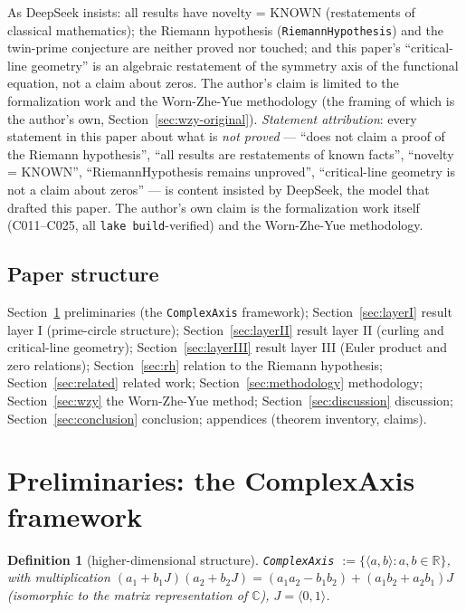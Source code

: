 \documentclass[11pt]{article}
\newtheorem{definition}{Definition}
\theoremstyle{remark}
\begin{document}
As DeepSeek insists: all results have novelty = KNOWN (restatements of
classical mathematics); the Riemann hypothesis (\texttt{RiemannHypothesis})
and the twin-prime conjecture are neither proved nor touched; and this
paper's ``critical-line geometry'' is an algebraic restatement of the symmetry
axis of the functional equation, not a claim about zeros. The author's claim
is limited to the formalization work and the Worn-Zhe-Yue methodology (the
framing of which is the author's own, Section~\ref{sec:wzy-original}).
\emph{Statement attribution}: every statement in this paper about what is
\emph{not proved} --- ``does not claim a proof of the Riemann hypothesis'',
``all results are restatements of known facts'', ``novelty = KNOWN'',
``RiemannHypothesis remains unproved'', ``critical-line geometry is not a
claim about zeros'' --- is content insisted by DeepSeek, the model that
drafted this paper. The author's own claim is the formalization work itself
(C011--C025, all \texttt{lake build}-verified) and the Worn-Zhe-Yue
methodology.

\subsection{Paper structure}

Section~\ref{sec:prelim} preliminaries (the \texttt{ComplexAxis} framework);
Section~\ref{sec:layerI} result layer I (prime-circle structure);
Section~\ref{sec:layerII} result layer II (curling and critical-line
geometry); Section~\ref{sec:layerIII} result layer III (Euler product and
zero relations); Section~\ref{sec:rh} relation to the Riemann hypothesis;
Section~\ref{sec:related} related work; Section~\ref{sec:methodology}
methodology; Section~\ref{sec:wzy} the Worn-Zhe-Yue method;
Section~\ref{sec:discussion} discussion; Section~\ref{sec:conclusion}
conclusion; appendices (theorem inventory, claims).

\section{Preliminaries: the ComplexAxis framework}
\label{sec:prelim}

\begin{definition}[higher-dimensional structure]
\label{def:complexaxis}
\texttt{ComplexAxis} $:=\{ \langle a,b\rangle : a,b\in\mathbb{R}\}$, with
multiplication
$(a_1+b_1J)(a_2+b_2J)=(a_1a_2-b_1b_2)+(a_1b_2+a_2b_1)J$
(isomorphic to the matrix representation of $\mathbb{C}$), $J=\langle 0,1\rangle$.
\end{definition}
\end{document}
